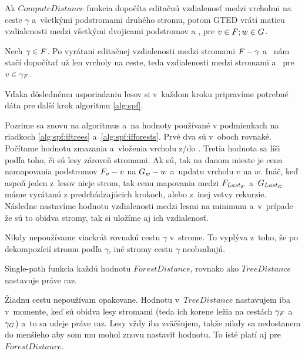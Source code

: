 \begin{lemma}
  Ak $ComputeDistance$ funkcia dopočíta editačnú vzdialenosť medzi vrcholmi na ceste $\gamma$
  a~všetkými podstromami druhého stromu, potom GTED vráti maticu vzdialenosti
  medzi všetkými dvojicami podstromov  a , pre $v \in F; w \in G$.
\end{lemma}

\begin{dukaz}
  Nech $\gamma \in F$. Po vyrátani editačnej vzdialenosti medzi stromami
  $F - \gamma$ a~ nám stačí dopočítať už len vrcholy na ceste,
  teda vzdialenosti medzi stromami  a~ pre $v \in \gamma_{F}$.
\end{dukaz}

Vďaka dôslednému usporiadaniu lesov si v~každom kroku pripravíme potrebné
dáta pre ďalší krok algoritmu \ref{alg:spf}.

Pozrime sa znovu na algoritmus a~na hodnoty používané v podmienkach na riadkoch
\ref{alg:spf:iftrees} a~\ref{alg:spf:ifforests}. Prvé dva sú v~oboch rovnaké.
Počítame hodnotu zmazania a~vloženia vrcholu \mbox{z/do} .
Tretia hodnota sa líši podľa toho, či sú lesy zároveň stromami. Ak sú, tak na danom mieste
je cena namapovania podstromov $F_{v} - v$ na $G_{w} - w$ a~updatu vrcholu $v$ na $w$.
Ináč, keď aspoň jeden z~lesov nieje strom, tak cenu mapovania medzi
$F_{Last_{F}}$ a~$G_{Last_{G}}$
máme vyrátanú z predchádzajúcich krokoch, alebo z~inej vetvy rekurzie.
Následne nastavíme hodnotu vzdialenosti medzi lesmi na minimum a~v~prípade že sú to obidva stromy,
tak si uložíme aj ich vzdialenosť.

\begin{pozn}
  Nikdy nepoužívame viackrát rovnakú cestu $\gamma$ v~strome. To vyplýva z~toho, že po dekompozícií
  stromu podľa $\gamma$, iné stromy cestu $\gamma$ neobsahujú.
\end{pozn}

\begin{pozn}
  Single-path funkcia každú hodnotu $ForestDistance$, rovnako ako $TreeDistance$ nastavuje
  práve raz.
\end{pozn}

\begin{dukaz}
  Žiadnu cestu nepoužívam opakovane. Hodnotu v~$TreeDistance$ nastavujem iba v~momente,
  keď sú obidva lesy stromami (teda ich korene ležia na cestách
  $\gamma_{F}$ a~$\gamma_{G}$) a~to sa udeje práve raz.
  Lesy vždy iba zväčšujem, takže nikdy sa nedostanem do menšieho aby som mu mohol znovu nastaviť
  hodnotu. To isté platí aj pre $ForestDistance$.
\end{dukaz}

